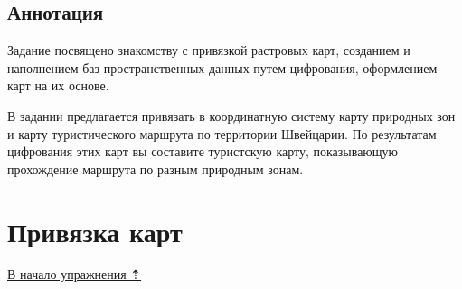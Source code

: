 \documentclass[]{book}
\theoremstyle{definition}
\theoremstyle{definition}
\theoremstyle{definition}
\theoremstyle{remark}
\begin{document}
\hypertarget{map-ref-general-anno}{%
\subsection{Аннотация}\label{map-ref-general-anno}}

Задание посвящено знакомству с привязкой растровых карт, созданием и
наполнением баз пространственных данных путем цифрования, оформлением
карт на их основе.

В задании предлагается привязать в координатную систему карту природных
зон и карту туристического маршрута по территории Швейцарии. По
результатам цифрования этих карт вы составите туристскую карту,
показывающую прохождение маршрута по разным природным зонам.

\hypertarget{map-ref-general-referencing}{%
\section{Привязка карт}\label{map-ref-general-referencing}}

\protect\hyperlink{map-ref-general}{В начало упражнения ⇡}
\end{document}
